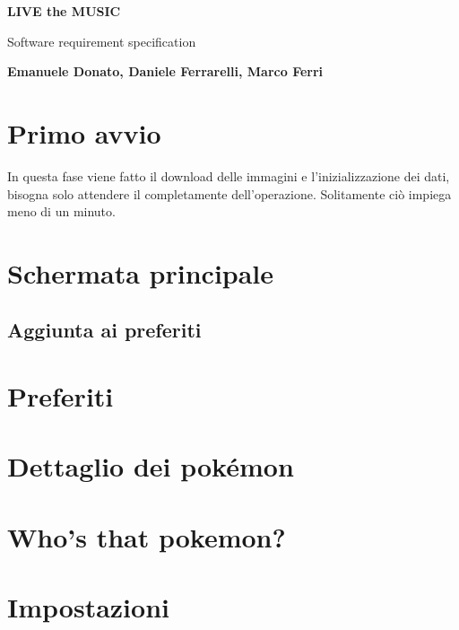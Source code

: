 \documentclass{article}
\begin{document}
\begin{titlepage}
   \begin{center}
       \vspace*{1cm}
 
       \textbf{LIVE the MUSIC}
 
       \vspace{0.5cm}
        Software requirement specification
 
       \vspace{5cm}
 
       \textbf{Emanuele Donato, Daniele Ferrarelli, Marco Ferri}
 
       \vfill
   \end{center}
\end{titlepage}
  \section{Primo avvio}
  In questa fase viene fatto il download delle immagini e l’inizializzazione dei dati, bisogna solo attendere il completamente dell’operazione. Solitamente ciò impiega meno di un minuto.
  \section{Schermata principale}
  \subsection{Aggiunta ai preferiti}
  \section{Preferiti}
  \section{Dettaglio dei pokémon}
  \section{Who’s that pokemon?}
  \section{Impostazioni}
\end{document}
